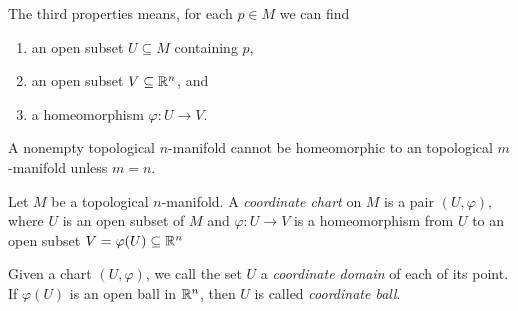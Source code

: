 \begin{remark}
    The third properties means, for each $p \in M$ we can find
    \begin{enumerate}
        \item an open subset $U \subseteq M$ containing $p$,
        \item an open subset $V \subseteq \mathbb{R}^n$, and
        \item a homeomorphism $\varphi: U \to V$.
    \end{enumerate}
\end{remark}
\begin{theorem}
    A nonempty topological $n$-manifold cannot be homeomorphic to an topological $m$-manifold unless $m = n$.
\end{theorem}
\begin{definition}
    Let $M$ be a topological $n$-manifold. A \textit{coordinate chart} on $M$ is a pair $(U,\varphi)$, where $U$ is an open subset of $M$ and $\varphi: U \to V$ is a homeomorphism from $U$ to an open subset $V = \varphi(U) \subseteq \mathbb{R}^n$
\end{definition}
\begin{definition}
    Given a chart $(U,\varphi)$, we call the set $U$ a \textit{coordinate domain} of each of its point. If $\varphi(U)$ is an open ball in $\mathbb{R}^n$, then $U$ is called \textit{coordinate ball}.
\end{definition}

